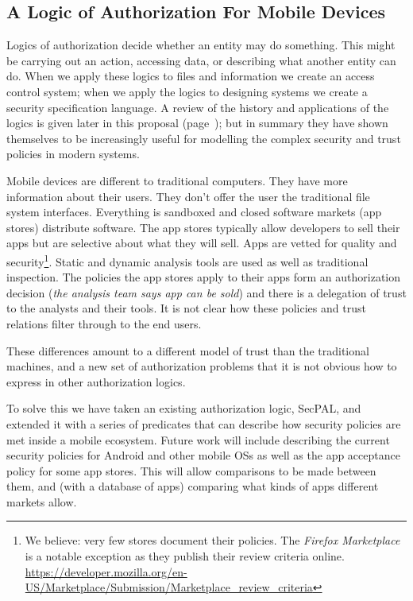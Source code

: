 \documentclass[a4paper,sfsidenotes]{tufte-book}
\begin{document}
\subsection{A Logic of Authorization For Mobile Devices}

Logics of authorization decide whether an entity may do something. This might be
carrying out an action, accessing data, or describing what another entity can
do. When we apply these logics to files and information we create an access
control system; when we apply the logics to designing systems we create a
security specification language.  A review of the history and applications of
the logics is given later in this proposal (page~\pageref{sec:pollang}); but in
summary they have shown themselves to be increasingly useful for modelling the
complex security and trust policies in modern systems.

Mobile devices are different to traditional computers. They have more
information about their users. They don't offer the user the traditional file
system interfaces. Everything is sandboxed and closed software markets (app
stores) distribute software.  The app stores typically allow developers to sell
their apps but are selective about what they will sell.  Apps are vetted for
quality and security\footnote{We believe: very few stores document their
  policies.  The \emph{Firefox Marketplace} is a notable exception as they
  publish their review criteria online.
  \url{https://developer.mozilla.org/en-US/Marketplace/Submission/Marketplace_review_criteria}}.
  Static and dynamic analysis tools are used as well as traditional inspection.
  The policies the app stores apply to their apps form an authorization decision
  (\emph{the analysis team says app can be sold}) and there is a delegation of
  trust to the analysts and their tools. It is not clear how these policies and
  trust relations filter through to the end users.

These differences amount to a different model of trust
than the traditional machines, and a new set of authorization problems that it
is not obvious how to express in other authorization logics. 

To solve this we have taken an existing authorization logic,
SecPAL\cite{Becker:2006vh}, and extended it with a series of predicates that can
describe how security policies are met inside a mobile ecosystem.  Future work
will include describing the current security policies for Android and other
mobile OSs as well as the app acceptance policy for some app stores.  This will allow comparisons to be
made between them, and (with a database of apps) comparing what kinds of apps
different markets allow.
\end{document}
